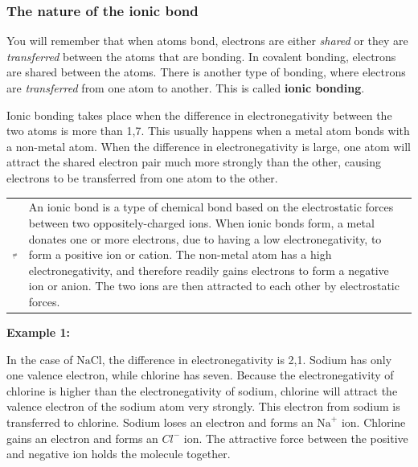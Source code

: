             \subsubsection{ The nature of the ionic bond}
            \nopagebreak
        \label{m38684*id142190}You will remember that when atoms bond, electrons are either \textsl{shared} or they are \textsl{transferred} between the atoms that are bonding. In covalent bonding, electrons are shared between the atoms. There is another type of bonding, where electrons are \textsl{transferred} from one atom to another. This is called \textbf{ionic bonding}.\par 
        \label{m38684*id142218}Ionic bonding takes place when the difference in electronegativity between the two atoms is more than 1,7. This usually happens when a metal atom bonds with a non-metal atom. When the difference in electronegativity is large, one atom will attract the shared electron pair much more strongly than the other, causing electrons to be transferred from one atom to the other.\par 
\label{m38684*fhsst!!!underscore!!!id456}\begin{definition}
	  \begin{tabular*}{15 cm}{m{15 mm}m{}}
	\hspace*{-50pt}  \includegraphics[width=0.5in]{col11305.imgs/psflag2.png}   & \Definition{   \label{id2430088}\textbf{ Ionic bond }} { \label{m38684*meaningfhsst!!!underscore!!!id456}
        An ionic bond is a type of chemical bond based on the electrostatic forces between two oppositely-charged ions. When ionic bonds form, a metal donates one or more electrons, due to having a low electronegativity, to form a positive ion or cation. The non-metal atom has a high electronegativity, and therefore readily gains electrons to form a negative ion or anion. The two ions are then attracted to each other by electrostatic forces.
         } 
      \end{tabular*}
      \end{definition}
        \label{m38684*id142248}
          \textbf{Example 1:}
        \par 
        \label{m38684*id142255}In the case of $\mathrm{NaCl}$, the difference in electronegativity is 2,1. Sodium has only one valence electron, while chlorine has seven. Because the electronegativity of chlorine is higher than the electronegativity of sodium, chlorine will attract the valence electron of the sodium atom very strongly. This electron from sodium is transferred to chlorine. Sodium loses an electron and forms an ${\mathrm{Na}}^{+}$ ion. Chlorine gains an electron and forms an ${Cl}^{-}$ ion. The attractive force between the positive and negative ion holds the molecule together.\par 

